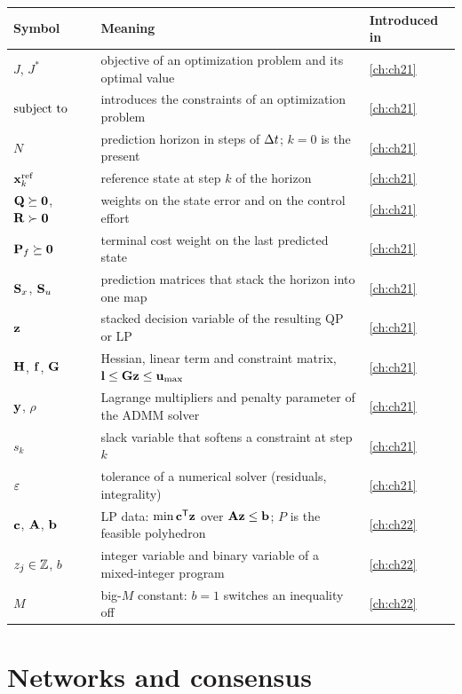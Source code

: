 {\small\renewcommand{\arraystretch}{1.0}%
\noindent\begin{tabularx}{\textwidth}{@{}lYl@{}}
\toprule
\textbf{Symbol} & \textbf{Meaning} & \textbf{Introduced in}\\
\midrule
$J$, $J^*$ & objective of an optimization problem and its optimal value & \cref{ch:ch21}\\
$\text{subject to}\quad$ & introduces the constraints of an optimization problem & \cref{ch:ch21}\\
$N$ & prediction horizon in steps of $\Delta t$; $k=0$ is the present & \cref{ch:ch21}\\
$\mathbf{x}_k^{\mathrm{ref}}$ & reference state at step $k$ of the horizon & \cref{ch:ch21}\\
$\mathbf{Q}\succeq\mathbf{0}$, $\mathbf{R}\succ\mathbf{0}$ & weights on the state error and on the control effort & \cref{ch:ch21}\\
$\mathbf{P}_f\succeq\mathbf{0}$ & terminal cost weight on the last predicted state & \cref{ch:ch21}\\
$\mathbf{S}_x$, $\mathbf{S}_u$ & prediction matrices that stack the horizon into one map & \cref{ch:ch21}\\
$\mathbf{z}$ & stacked decision variable of the resulting QP or LP & \cref{ch:ch21}\\
$\mathbf{H}$, $\mathbf{f}$, $\mathbf{G}$ & Hessian, linear term and constraint matrix, $\mathbf{l}\le\mathbf{G}\mathbf{z}\le\mathbf{u}_{\max}$ & \cref{ch:ch21}\\
$\mathbf{y}$, $\rho$ & Lagrange multipliers and penalty parameter of the ADMM solver & \cref{ch:ch21}\\
$s_k$ & slack variable that softens a constraint at step $k$ & \cref{ch:ch21}\\
$\varepsilon$ & tolerance of a numerical solver (residuals, integrality) & \cref{ch:ch21}\\
$\mathbf{c}$, $\mathbf{A}$, $\mathbf{b}$ & LP data: $\min \mathbf{c}^{\mathsf{T}}\mathbf{z}$ over $\mathbf{A}\mathbf{z}\le\mathbf{b}$; $P$ is the feasible polyhedron & \cref{ch:ch22}\\
$z_j\in\mathbb{Z}$, $b$ & integer variable and binary variable of a mixed-integer program & \cref{ch:ch22}\\
$M$ & big-$M$ constant: $b=1$ switches an inequality off & \cref{ch:ch22}\\
\bottomrule
\end{tabularx}\par}

\section*{Networks and consensus}

